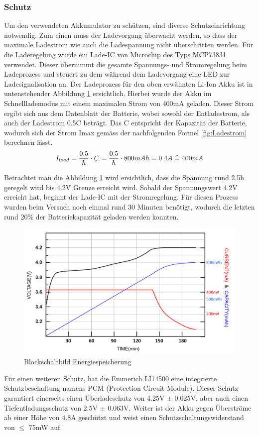\subsubsection{Schutz}
Um den verwendeten Akkumulator zu schützen, sind diverse Schutzeinrichtung notwendig. Zum einen muss der Ladevorgang überwacht werden, so dass der maximale Ladestrom wie auch die Ladespannung nicht überschritten werden. Für die Laderegelung wurde ein Lade-IC von Microchip des Typs MCP73831 verwendet. Dieser übernimmt die gesamte Spannungs- und Stromregelung beim Ladeprozess und steuert zu dem während dem Ladevorgang eine LED zur Ladesignalisation an. Der Ladeprozess für den oben erwähnten Li-Ion Akku ist in untenstehender Abbildung  \ref{fig:Ladekurve Li-Ion Akku} ersichtlich. Hierbei wurde der Akku im Schnelllademodus mit einem maximalen Strom von 400mA geladen. Dieser Strom ergibt sich aus dem Datenblatt der Batterie, wobei sowohl der Entladestrom, als auch der Ladestrom 0.5C beträgt. Das C entspricht der Kapazität der Batterie, wodurch sich der Strom Imax gemäss der nachfolgenden Formel \ref{fig:Ladestrom} berechnen lässt.
\begin{equation}
I_{load}={\frac{0.5}{h} \cdot C}={\frac{0.5}{h} \cdot 800mAh}=0.4A\thickspace \widehat {=} \thickspace 400mA
\label{fig:Ladestrom}
\end{equation}

Betrachtet man die Abbildung \ref{fig:Ladekurve Li-Ion Akku} wird ersichtlich, dass die Spannung rund 2.5h geregelt wird bis 4.2V Grenze erreicht wird. Sobald der Spannungswert 4.2V erreicht hat, beginnt der Lade-IC mit der Stromregelung. Für diesen Prozess wurden beim Versuch noch einmal rund 30 Minuten benötigt, wodurch die letzten rund 20$\%$ der Batteriekapazität geladen werden konnten.

\begin{figure}[H]
	\begin{center}
		\includegraphics[width=120mm]{data/LadekurveLiIon.png}
		\caption{Blockschaltbild Energiespeicherung} %
		\label{fig:Ladekurve Li-Ion Akku}
	\end{center}
\end{figure}


Für einen weiteren Schutz, hat die Emmerich LI14500 eine integrierte Schutzbeschaltung namens PCM (Protection Circuit Module). Dieser Schutz garantiert einerseits einen Überladeschutz von 4.25V $\pm$ 0.025V, aber auch einen Tiefentladungsschutz von 2.5V $\pm$ 0.063V. Weiter ist der Akku gegen Überströme ab einer Höhe von 4.8A geschützt und weist einen Schutzschaltungswiderstand von $\leq$ 75mW auf.


